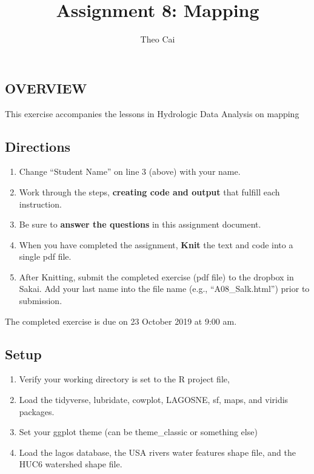\documentclass[]{article}
\title{Assignment 8: Mapping}
\author{Theo Cai}
\date{}
\providecommand{\tightlist}{%
  \setlength{\itemsep}{0pt}\setlength{\parskip}{0pt}}
\begin{document}
\maketitle

\hypertarget{overview}{%
\subsection{OVERVIEW}\label{overview}}

This exercise accompanies the lessons in Hydrologic Data Analysis on
mapping

\hypertarget{directions}{%
\subsection{Directions}\label{directions}}

\begin{enumerate}
\def\labelenumi{\arabic{enumi}.}
\tightlist
\item
  Change ``Student Name'' on line 3 (above) with your name.
\item
  Work through the steps, \textbf{creating code and output} that fulfill
  each instruction.
\item
  Be sure to \textbf{answer the questions} in this assignment document.
\item
  When you have completed the assignment, \textbf{Knit} the text and
  code into a single pdf file.
\item
  After Knitting, submit the completed exercise (pdf file) to the
  dropbox in Sakai. Add your last name into the file name (e.g.,
  ``A08\_Salk.html'') prior to submission.
\end{enumerate}

The completed exercise is due on 23 October 2019 at 9:00 am.

\hypertarget{setup}{%
\subsection{Setup}\label{setup}}

\begin{enumerate}
\def\labelenumi{\arabic{enumi}.}
\tightlist
\item
  Verify your working directory is set to the R project file,
\item
  Load the tidyverse, lubridate, cowplot, LAGOSNE, sf, maps, and viridis
  packages.
\item
  Set your ggplot theme (can be theme\_classic or something else)
\item
  Load the lagos database, the USA rivers water features shape file, and
  the HUC6 watershed shape file.
\end{enumerate}
\end{document}
